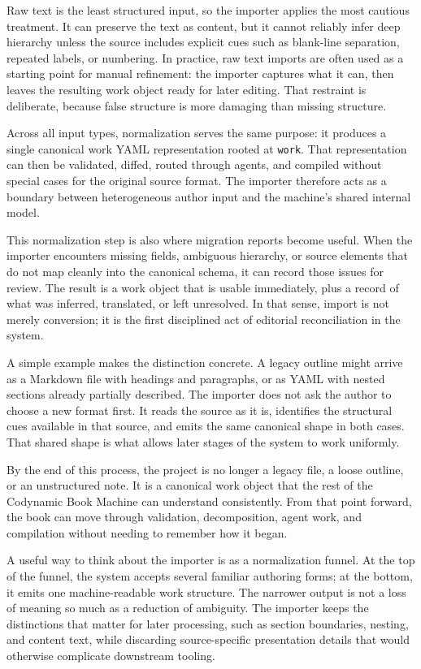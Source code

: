 Raw text is the least structured input, so the importer applies the most cautious treatment. It can preserve the text as content, but it cannot reliably infer deep hierarchy unless the source includes explicit cues such as blank-line separation, repeated labels, or numbering. In practice, raw text imports are often used as a starting point for manual refinement: the importer captures what it can, then leaves the resulting work object ready for later editing. That restraint is deliberate, because false structure is more damaging than missing structure.

Across all input types, normalization serves the same purpose: it produces a single canonical work YAML representation rooted at \texttt{work}. That representation can then be validated, diffed, routed through agents, and compiled without special cases for the original source format. The importer therefore acts as a boundary between heterogeneous author input and the machine's shared internal model.

This normalization step is also where migration reports become useful. When the importer encounters missing fields, ambiguous hierarchy, or source elements that do not map cleanly into the canonical schema, it can record those issues for review. The result is a work object that is usable immediately, plus a record of what was inferred, translated, or left unresolved. In that sense, import is not merely conversion; it is the first disciplined act of editorial reconciliation in the system.

A simple example makes the distinction concrete. A legacy outline might arrive as a Markdown file with headings and paragraphs, or as YAML with nested sections already partially described. The importer does not ask the author to choose a new format first. It reads the source as it is, identifies the structural cues available in that source, and emits the same canonical shape in both cases. That shared shape is what allows later stages of the system to work uniformly.

By the end of this process, the project is no longer a legacy file, a loose outline, or an unstructured note. It is a canonical work object that the rest of the Codynamic Book Machine can understand consistently. From that point forward, the book can move through validation, decomposition, agent work, and compilation without needing to remember how it began.

A useful way to think about the importer is as a normalization funnel. At the top of the funnel, the system accepts several familiar authoring forms; at the bottom, it emits one machine-readable work structure. The narrower output is not a loss of meaning so much as a reduction of ambiguity. The importer keeps the distinctions that matter for later processing, such as section boundaries, nesting, and content text, while discarding source-specific presentation details that would otherwise complicate downstream tooling.

